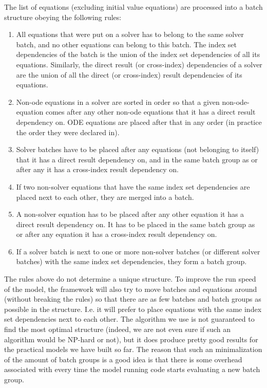 \documentclass[11pt]{article}
\theoremstyle{definition}
\begin{document}
The list of equations (excluding initial value equations) are processed into a batch structure obeying the following rules:
\begin{enumerate}[i]
\item All equations that were put on a solver has to belong to the same solver batch, and no other equations can belong to this batch. The index set dependencies of the batch is the union of the index set dependencies of all its equations. Similarly, the direct result (or cross-index) dependencies of a solver are the union of all the direct (or cross-index) result dependencies of its equations.
\item Non-ode equations in a solver are sorted in order so that a given non-ode-equation comes after any other non-ode equations that it has a direct result dependency on. ODE equations are placed after that in any order (in practice the order they were declared in).
\item Solver batches have to be placed after any equations (not belonging to itself) that it has a direct result dependency on, and in the same batch group as or after any it has a cross-index result dependency on.
\item If two non-solver equations that have the same index set dependencies are placed next to each other, they are merged into a batch.
\item A non-solver equation has to be placed after any other equation it has a direct result dependency on. It has to be placed in the same batch group as or after any equation it has a cross-index result dependency on.
\item If a solver batch is next to one or more non-solver batches (or different solver batches) with the same index set dependencies, they form a batch group.
\end{enumerate}

The rules above do not determine a unique structure. To improve the run speed of the model, the framework will also try to move batches and equations around (without breaking the rules) so that there are as few batches and batch groups as possible in the structure. I.e. it will prefer to place equations with the same index set dependencies next to each other. The algorithm we use is not guaranteed to find the most optimal structure (indeed, we are not even sure if such an algorithm would be NP-hard or not), but it does produce pretty good results for the practical models we have built so far. The reason that such an minimalization of the amount of batch groups is a good idea is that there is some overhead associated with every time the model running code starts evaluating a new batch group.
\end{document}
